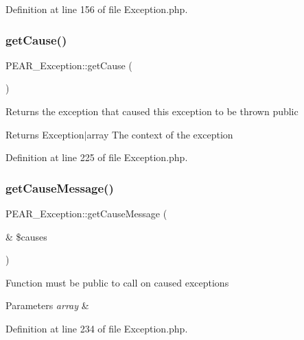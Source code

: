 Definition at line 156 of file Exception.\+php.

\hypertarget{classPEAR__Exception_abc2aa18bf5cf14ab29e01d14eed7e041}{}\label{classPEAR__Exception_abc2aa18bf5cf14ab29e01d14eed7e041} 
\subsubsection{\texorpdfstring{get\+Cause()}{getCause()}}
{\footnotesize\ttfamily P\+E\+A\+R\+\_\+\+Exception\+::get\+Cause (\begin{DoxyParamCaption}{ }\end{DoxyParamCaption})}

Returns the exception that caused this exception to be thrown  public \begin{DoxyReturn}{Returns}
Exception$\vert$array The context of the exception 
\end{DoxyReturn}


Definition at line 225 of file Exception.\+php.

\hypertarget{classPEAR__Exception_a1c16ee57f4091d424c1bbcd904dda4f4}{}\label{classPEAR__Exception_a1c16ee57f4091d424c1bbcd904dda4f4} 
\subsubsection{\texorpdfstring{get\+Cause\+Message()}{getCauseMessage()}}
{\footnotesize\ttfamily P\+E\+A\+R\+\_\+\+Exception\+::get\+Cause\+Message (\begin{DoxyParamCaption}\item[{\&}]{\$causes }\end{DoxyParamCaption})}

Function must be public to call on caused exceptions 
\begin{DoxyParams}{Parameters}
{\em array} & \\
\hline
\end{DoxyParams}


Definition at line 234 of file Exception.\+php.

\hypertarget{classPEAR__Exception_a747dd232565b7e07ec7ef55e46405f4e}{}\label{classPEAR__Exception_a747dd232565b7e07ec7ef55e46405f4e} 
